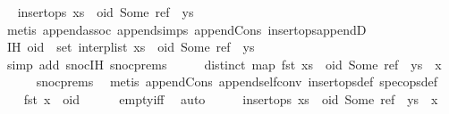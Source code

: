 \begin{isabellebody}
\ \isamarkupfalse%
\ {\isachardoublequoteopen}insert{\isacharunderscore}ops\ {\isacharparenleft}xs\ {\isacharat}\ {\isacharparenleft}oid{\isacharcomma}\ Some\ ref{\isacharparenright}\ {\isacharhash}\ ys{\isacharparenright}{\isachardoublequoteclose}\isanewline
\ \ \ \ \isamarkupfalse%
\ {\isacharparenleft}metis\ append{\isachardot}assoc\ append{\isachardot}simps{\isacharparenleft}{}{\isacharparenright}\ append{\isacharunderscore}Cons\ insert{\isacharunderscore}ops{\isacharunderscore}appendD{\isacharparenright}\isanewline
\ \ \isamarkupfalse%
\ IH{\isacharcolon}\ {\isachardoublequoteopen}oid\ {\isasymnotin}\ set\ {\isacharparenleft}interp{\isacharunderscore}list\ {\isacharparenleft}xs\ {\isacharat}\ {\isacharparenleft}oid{\isacharcomma}\ Some\ ref{\isacharparenright}\ {\isacharhash}\ ys{\isacharparenright}{\isacharparenright}{\isachardoublequoteclose}\isanewline
\ \ \ \ \isamarkupfalse%
\ {\isacharparenleft}simp\ add{\isacharcolon}\ snoc{\isachardot}IH\ snoc{\isachardot}prems{\isacharparenleft}{}{\isacharparenright}{\isacharparenright}\isanewline
\ \ \isamarkupfalse%
\ \isamarkupfalse%
\ {\isachardoublequoteopen}distinct\ {\isacharparenleft}map\ fst\ {\isacharparenleft}xs\ {\isacharat}\ {\isacharparenleft}oid{\isacharcomma}\ Some\ ref{\isacharparenright}\ {\isacharhash}\ ys\ {\isacharat}\ {\isacharbrackleft}x{\isacharbrackright}{\isacharparenright}{\isacharparenright}{\isachardoublequoteclose}\isanewline
\ \ \ \ \isamarkupfalse%
\ snoc{\isachardot}prems\ \isamarkupfalse%
\ {\isacharparenleft}metis\ append{\isacharunderscore}Cons\ append{\isacharunderscore}self{\isacharunderscore}conv{}\ insert{\isacharunderscore}ops{\isacharunderscore}def\ spec{\isacharunderscore}ops{\isacharunderscore}def{\isacharparenright}\isanewline
\ \ \isamarkupfalse%
\ {\isachardoublequoteopen}fst\ x\ {\isasymnoteq}\ oid{\isachardoublequoteclose}\isanewline
\ \ \ \ \isamarkupfalse%
\ empty{\isacharunderscore}iff\ \isamarkupfalse%
\ auto\isanewline
\ \ \isamarkupfalse%
\ \isamarkupfalse%
\ {\isachardoublequoteopen}insert{\isacharunderscore}ops\ {\isacharparenleft}{\isacharparenleft}xs\ {\isacharat}\ {\isacharparenleft}oid{\isacharcomma}\ Some\ ref{\isacharparenright}\ {\isacharhash}\ ys{\isacharparenright}\ {\isacharat}\ {\isacharbrackleft}x{\isacharbrackright}{\isacharparenright}{\isachardoublequoteclose}\isanewline
\ \ \ \ \isamarkupfalse%

\end{isabellebody}

